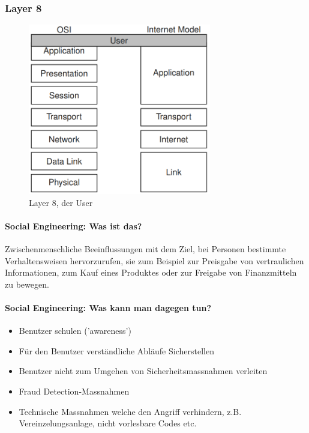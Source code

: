 \documentclass[10pt,a4paper]{article}
\begin{document}
\subsubsection*{Layer 8}
\begin{figure}[H]
    \begin{center}
    \includegraphics[width=8cm]{images/Layer8.png}
    \caption{Layer 8, der User}
    \label{Layer 8}
    \end{center}
\end{figure}

\paragraph*{Social Engineering: Was ist das?}Zwischenmenschliche Beeinflussungen mit dem Ziel, bei
Personen bestimmte Verhaltensweisen hervorzurufen, sie zum
Beispiel zur Preisgabe von vertraulichen Informationen, zum
Kauf eines Produktes oder zur Freigabe von Finanzmitteln zu
bewegen.

\paragraph*{Social Engineering: Was kann man dagegen tun?}
\begin{itemize}[noitemsep,topsep=0pt,leftmargin=*]
    \item Benutzer schulen ('awareness')
    \item Für den Benutzer verständliche Abläufe Sicherstellen
    \item Benutzer nicht zum Umgehen von Sicherheitsmassnahmen verleiten
    \item Fraud Detection-Massnahmen
    \item Technische Massnahmen welche den Angriff verhindern, z.B. Vereinzelungsanlage, nicht vorlesbare Codes etc.
\end{itemize}
\end{document}
